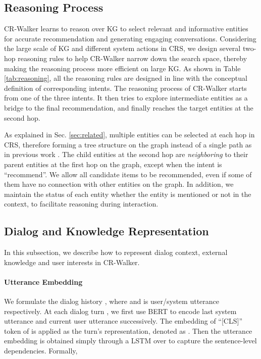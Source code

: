 \documentclass[11pt]{article}
\begin{document}
\subsection{Reasoning Process}\label{sec:reasoning}
CR-Walker learns to reason over KG to select relevant and informative entities for accurate recommendation and generating engaging conversations. Considering the large scale of KG and different system actions in CRS, we design several two-hop reasoning rules to help CR-Walker narrow down the search space, thereby making the reasoning process more efficient on large KG.  
As shown in Table \ref{tab:reasoning}, all the reasoning rules are designed in line with the conceptual definition of corresponding intents. 
The reasoning process of CR-Walker starts from one of the three intents. It then tries to explore intermediate entities as a bridge to the final recommendation, and finally reaches the target entities at the second hop.


As explained in Sec. \ref{sec:related}, multiple entities can be selected at each hop in CRS, therefore forming a tree structure on the graph instead of a single path as in previous work \cite{moon2019opendialkg}. The child entities at the second hop are \textit{neighboring} to their parent entities at the first hop on the graph, except when the intent is ``recommend''. We allow all candidate items to be recommended, even if some of them have no connection with other entities on the graph. In addition, we maintain the status of each entity whether the entity is mentioned or not in the context, to facilitate reasoning during interaction.


\subsection{Dialog and Knowledge Representation}
In this subsection, we describe how to represent dialog context, external knowledge and user interests in CR-Walker.

\paragraph{Utterance Embedding}
We formulate the dialog history , where  and  is user/system utterance respectively. At each dialog turn , we first use BERT \cite{devlin2019bert} to encode last system utterance  and current user utterance  successively. The embedding of ``[CLS]'' token of  is applied as the turn's representation, denoted as . Then the utterance embedding  is obtained simply through a LSTM over  to capture the sentence-level dependencies. 
Formally,
\end{document}
